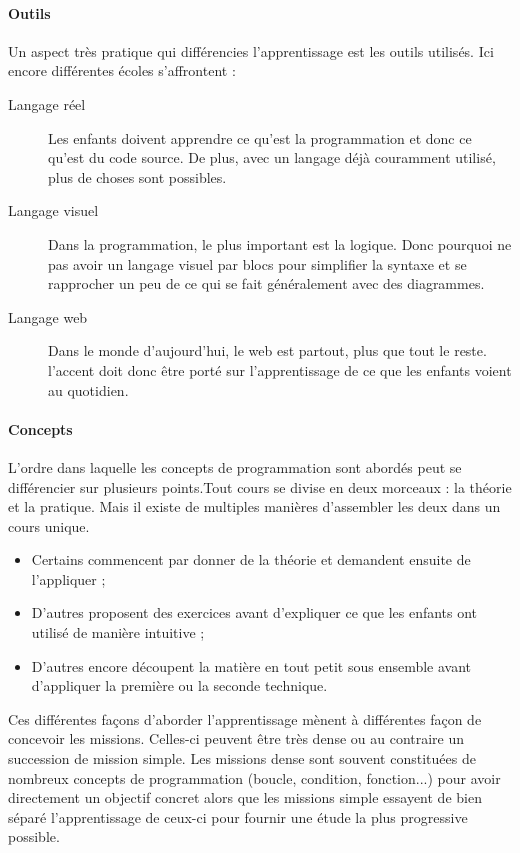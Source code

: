 \paragraph{Outils} 
Un aspect très pratique qui différencies l'apprentissage est les outils utilisés. Ici encore différentes écoles s'affrontent :
\begin{description}
  \item[Langage réel] Les enfants doivent apprendre ce qu'est la programmation et donc ce qu'est du code source. De plus, avec un langage déjà couramment utilisé, plus de choses sont possibles.
  \item[Langage visuel] Dans la programmation, le plus important est la logique. Donc pourquoi ne pas avoir un langage visuel par blocs pour simplifier la syntaxe et se rapprocher un peu de ce qui se fait généralement avec des diagrammes.
  \item[Langage web] Dans le monde d'aujourd'hui, le web est partout, plus que tout le reste. l'accent doit donc être porté sur l'apprentissage de ce que les enfants voient au quotidien.
\end{description}

\paragraph{Concepts} 
L'ordre dans laquelle les concepts de programmation sont abordés peut se différencier sur plusieurs points.Tout cours se divise en deux morceaux : la théorie et la pratique. Mais il existe de multiples manières d'assembler les deux dans un cours unique.
\begin{itemize}
  \item Certains commencent par donner de la théorie et demandent ensuite de l'appliquer ;
  \item D'autres proposent des exercices avant d'expliquer ce que les enfants ont utilisé de manière intuitive ;
  \item D'autres encore découpent la matière en tout petit sous ensemble avant d'appliquer la première ou la seconde technique.\\
  \end{itemize}


Ces différentes façons d'aborder l'apprentissage mènent à différentes façon de concevoir les missions. Celles-ci peuvent être très dense ou au contraire un succession de mission simple. Les missions dense sont souvent constituées de nombreux concepts de programmation (boucle, condition, fonction...) pour avoir directement un objectif concret alors que les missions simple essayent de bien séparé l'apprentissage de ceux-ci pour fournir une étude la plus progressive possible.\\

